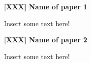 \documentclass[a4paper,12pt,english]{scrartcl}
\begin{document}
\pagestyle{fancy} %

\noindent
\textbf{\textsf{{\large [XXX] Name of paper 1}}}
\vspace{2mm}

Insert some text here!

\vspace{8mm}

\noindent
\textbf{\textsf{{\large [XXX] Name of paper 2}}}
\vspace{2mm}

Insert some text here!
\end{document}
